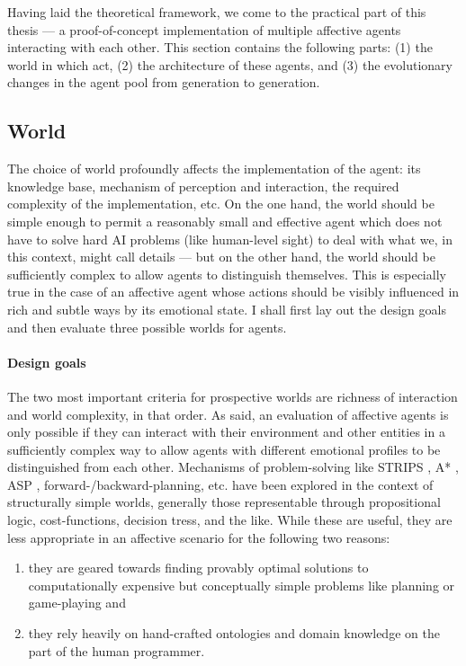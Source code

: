 Having laid the theoretical framework, we come to the practical part of this thesis --- a proof-of-concept implementation of multiple affective agents interacting with each other. This section contains the following parts: (1) the world in which act, (2) the architecture of these agents, and (3) the evolutionary changes in the agent pool from generation to generation.

\subsection{World}

The choice of world profoundly affects the implementation of the agent: its knowledge base, mechanism of perception and interaction, the required complexity of the implementation, etc. On the one hand, the world should be simple enough to permit a reasonably small and effective agent which does not have to solve hard AI problems (like human-level sight) to deal with what we, in this context, might call details --- but on the other hand, the world should be sufficiently complex to allow agents to distinguish themselves. This is especially true in the case of an affective agent whose actions should be visibly influenced in rich and subtle ways by its emotional state. I shall first lay out the design goals and then evaluate three possible worlds for agents.

\paragraph{Design goals} The two most important criteria for prospective worlds are richness of interaction and world complexity, in that order. As said, an evaluation of affective agents is only possible if they can interact with their environment and other entities in a sufficiently complex way to allow agents with different emotional profiles to be distinguished from each other. Mechanisms of problem-solving like STRIPS \cite{fikesNilsson}, A* \cite{nilssonAStar}, ASP \cite{lifschitz}, forward-/backward-planning, etc. have been explored in the context of structurally simple worlds, generally those representable through propositional logic, cost-functions, decision tress, and the like. While these are useful, they are less appropriate in an affective scenario for the following two reasons:

\begin{enumerate}
	\item they are geared towards finding provably optimal solutions to computationally expensive but conceptually simple problems like planning or game-playing and
	\item they rely heavily on hand-crafted ontologies and domain knowledge on the part of the human programmer.
\end{enumerate}

